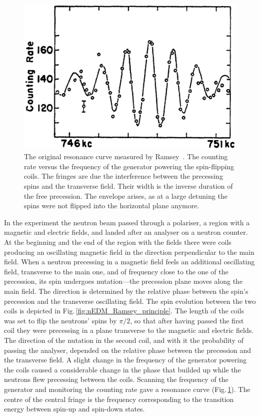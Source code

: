 \begin{figure}
  \centering
  \includegraphics[width=.6\linewidth]{gfx/introduction/Ramsey_original_resonance.png}
  \caption{The original resonance curve measured by Ramsey~\cite{PhysRev.108.120}. The counting rate versus the frequency of the generator powering the spin-flipping coils. The fringes are due the interference between the precessing spins and the transverse field. Their width is the inverse duration of the free precession. The envelope arises, as at a large detuning the spins were not flipped into the horizontal plane anymore.}
  \label{fig:nEDM_Ramsey_original_curve}
\end{figure}

In the experiment the neutron beam passed through a polariser, a region with a magnetic and electric fields, and landed after an analyser on a neutron counter. At the beginning and the end of the region with the fields there were coils producing an oscillating magnetic field in the direction perpendicular to the main field. When a neutron precessing in a magnetic field feels an additional oscillating field, transverse to the main one, and of frequency close to the one of the precession, its spin undergoes nutation---the precession plane moves along the main field. The direction is determined by the relative phase between the spin's precession and the transverse oscillating field. The spin evolution between the two coils is depicted in Fig.\,\ref{fig:nEDM_Ramsey_principle}. The length of the coils was set to flip the neutrons' spins by $\pi/2$, so that after having passed the first coil they were precessing in a plane transverse to the magnetic and electric fields. The direction of the nutation in the second coil, and with it the probability of passing the analyser, depended on the relative phase between the precession and the transverse field. A slight change in the frequency of the generator powering the coils caused a considerable change in the phase that builded up while the neutrons flew precessing between the coils. Scanning the frequency of the generator and monitoring the counting rate gave a resonance curve (Fig.\,\ref{fig:nEDM_Ramsey_original_curve}). The centre of the central fringe is the frequency corresponding to the transition energy between spin-up and spin-down states.

